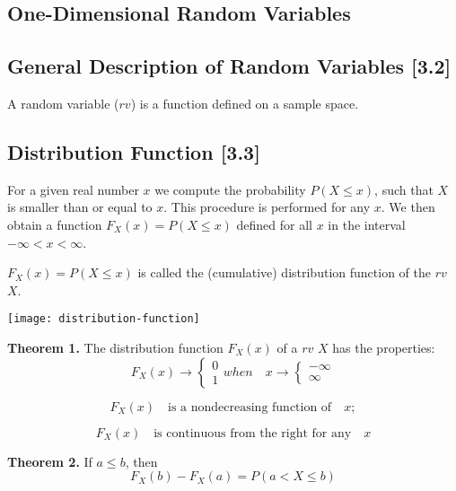 \documentclass[a4paper,9pt]{extarticle}
\begin{document}
\begin{multicols*}{2}
\section{One-Dimensional Random Variables}
\subsection{General Description of Random Variables [3.2]}
A random variable ($rv$) is a function defined on a sample space.

\subsection{Distribution Function [3.3]}
For a given real number $x$ we compute the probability $P(X \leq x)$, such that $X$ is smaller than or equal to $x$. This procedure is performed for any $x$. We then obtain a function $F_X(x) = P(X  \leq x)$ defined for all $x$ in the interval $-\infty < x < \infty$.

$F_X(x) = P(X  \leq x)$ is called the (cumulative) distribution function of the $rv$ $X$.

{\centering \texttt{[image: distribution-function]} \par}

\textbf{Theorem 1.} The distribution function $F_X(x)$ of a $rv$ $X$ has the properties:
\begin{equation} \label{3.2.1}
    F_X(x) \rightarrow \begin{cases}
        0 \\
        1
    \end{cases} when \quad x \rightarrow \begin{cases}
        -\infty \\
        \infty
    \end{cases}
\end{equation}

\begin{equation} \label{3.2.2}
    F_X(x) \quad \text{is a nondecreasing function of} \quad x;
\end{equation}

\begin{equation} \label{3.2.3}
    F_X(x) \quad \text{is continuous from the right for any} \quad x
\end{equation}

\textbf{Theorem 2.} If $a \leq b$, then
\begin{equation} \label{3.2.3}
    F_X(b) - F_X(a) = P(a < X \leq b)
\end{equation}

\end{multicols*}
\end{document}
